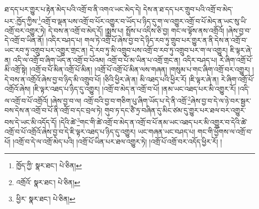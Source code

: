 ཐ་དད་པར་གྱུར་པ་རྟེན་མེད་པའི་འགྲོ་བ་ནི་འགའ་ཡང་མེད་དེ། དེས་ན་ཐ་དད་པར་གྲུབ་པའི་འགྲོ་བ་མེད་པར་:ཁྱོད་ཀྱིས་\footnote{ཁྱོད་ཀྱི་  སྣར་ཐང་།  པེ་ཅིན། }འགྲོ་བ་ལྡན་པས་འགྲོ་བ་པོར་འགྱུར་བ་ཡོད་པ་ཉིད་དུ་ག་ལ་འགྱུར་འགྲོ་བ་པོ་མེད་ན་ཡང་སུ་ཡི་འགྲོ་བར་འགྱུར་ཏེ། དེ་བས་ན་འགྲོ་བ་མེད་དོ། །སྨྲས་པ། སྤྲོས་པ་འདིས་ཅི་བྱ། གང་ལ་ལྟོས་ནས་འགྲོའོ། །ཞེས་བྱ་བ་དེ་འགྲོ་བ་ཡིན་ནོ། །འདིར་བཤད་པ། གལ་ཏེ་འགྲོ་པོ་ཞེས་བྱ་བ་དེ་ཉིད་རབ་ཏུ་གྲུབ་པར་གྱུར་ན་ནི་དེས་ན་འགྲོ་བ་ཡང་རབ་ཏུ་འགྲུབ་པར་འགྱུར་གྲང་ན། དེ་རབ་ཏུ་མི་འགྲུབ་པས་འགྲོ་བ་རབ་ཏུ་འགྲུབ་པར་ག་ལ་འགྱུར། ཇི་ལྟར་ཞེ་ན། འདི་ལ་འགྲོ་བ་ཞིག་ཡོད་ན་འགྲོ་བ་པོའམ། འགྲོ་བ་པོ་མ་ཡིན་པ་འགྲོ་གྲང་ན། འདིར་བཤད་པ། རེ་ཞིག་འགྲོ་པོ་མི་འགྲོ་སྟེ། །འགྲོ་བ་པོ་མིན་འགྲོ་པོ་མིན། །འགྲོ་པོ་འགྲོ་པོ་མིན་ལས་གཞན། །གསུམ་པ་གང་ཞིག་འགྲོ་བར་འགྱུར། །དེ་བས་ན་འགྲོའོ་ཞེས་བྱ་བ་ཉིད་མི་འགྲུབ་པོ། །ཅིའི་ཕྱིར་ཞེ་ན། མི་འཐད་པའི་ཕྱིར་རོ། །ཇི་ལྟར་ཞེ་ན། རེ་ཞིག་འགྲོ་པོ་འགྲོའོ་ཞེས། །ཇི་ལྟར་འཐད་པ་ཉིད་དུ་འགྱུར། །འགྲོ་བ་མེད་ན་འགྲོ་བ་པོ། །ནམ་ཡང་འཐད་པར་མི་འགྱུར་རོ། །འདི་ལ་འགྲོ་བ་པོ་འགྲོའོ། །ཞེས་བྱ་བ་ལ། འགྲོ་བའི་བྱ་བ་གཅིག་པུ་ཞིག་ཡོད་པ་དེ་ནི་འགྲོ་\footnote{འགྲོའོ་  སྣར་ཐང་།  པེ་ཅིན། }ཞེས་བྱ་བ་དེ་ལ་ཉེ་བར་སྦྱར་བས་དེས་ན་འགྲོ་བ་པོ་ནི་འགྲོ་བ་དང་བྲལ་ཏེ། གུབ་ཏ་དང་ཙཻ་ཏྲ་བཞིན་དུ་མིང་ཙམ་དུ་གྱུར་པར་ཐལ་བར་འགྱུར་བས་དེ་ཡང་མི་འདོད་དོ། །དེའི་ཚེ་\footnote{ཕྱིར་  སྣར་ཐང་།  པེ་ཅིན། }གང་གི་ཚེ་འགྲོ་བ་མེད་ན་འགྲོ་བ་པོ་ནམ་ཡང་འཐད་པར་མི་འགྱུར་བ་དེའི་ཚེ་འགྲོ་བ་པོ་འགྲོའོ་ཞེས་བྱ་བ་དེ་ཇི་ལྟར་འཐད་པ་ཉིད་དུ་འགྱུར། ཡང་གཞན་ཡང་བཤད་པ། གང་གི་ཕྱོགས་ལ་འགྲོ་བ་པོ། །འགྲོ་བ་དེ་ལ་འགྲོ་མེད་པའི། །འགྲོ་པོ་ཡིན་པར་ཐལ་འགྱུར་ཏེ། །འགྲོ་པོ་འགྲོ་བར་འདོད་ཕྱིར་རོ། །
